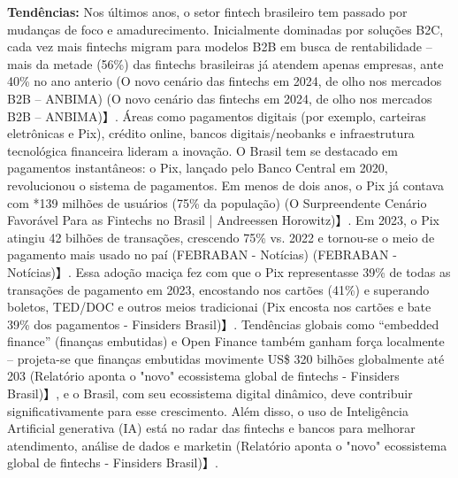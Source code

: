 \documentclass[12pt]{article}
\begin{document}
\textbf{Tendências:} Nos últimos anos, o setor fintech brasileiro tem passado por mudanças de foco e amadurecimento. Inicialmente dominadas por soluções B2C, cada vez mais fintechs migram para modelos B2B em busca de rentabilidade – mais da metade (56\%) das fintechs brasileiras já atendem apenas empresas, ante 40\% no ano anterio (O novo cenário das fintechs em 2024, de olho nos mercados B2B – ANBIMA) (O novo cenário das fintechs em 2024, de olho nos mercados B2B – ANBIMA)】. Áreas como pagamentos digitais (por exemplo, carteiras eletrônicas e Pix), crédito online, bancos digitais/neobanks e infraestrutura tecnológica financeira lideram a inovação. O Brasil tem se destacado em pagamentos instantâneos: o Pix, lançado pelo Banco Central em 2020, revolucionou o sistema de pagamentos. Em menos de dois anos, o Pix já contava com *139 milhões de usuários (75\% da população) (O Surpreendente Cenário Favorável Para as Fintechs no Brasil | Andreessen Horowitz)】. Em 2023, o Pix atingiu 42 bilhões de transações, crescendo 75\% vs. 2022 e tornou-se o meio de pagamento mais usado no paí (FEBRABAN - Notícias) (FEBRABAN - Notícias)】. Essa adoção maciça fez com que o Pix representasse 39\% de todas as transações de pagamento em 2023, encostando nos cartões (41\%) e superando boletos, TED/DOC e outros meios tradicionai (Pix encosta nos cartões e bate 39\% dos pagamentos - Finsiders Brasil)】. Tendências globais como “embedded finance” (finanças embutidas) e Open Finance também ganham força localmente – projeta-se que finanças embutidas movimente US\$ 320 bilhões globalmente até 203 (Relatório aponta o "novo" ecossistema global de fintechs - Finsiders Brasil)】, e o Brasil, com seu ecossistema digital dinâmico, deve contribuir significativamente para esse crescimento. Além disso, o uso de Inteligência Artificial generativa (IA) está no radar das fintechs e bancos para melhorar atendimento, análise de dados e marketin (Relatório aponta o "novo" ecossistema global de fintechs - Finsiders Brasil)】.
\end{document}
